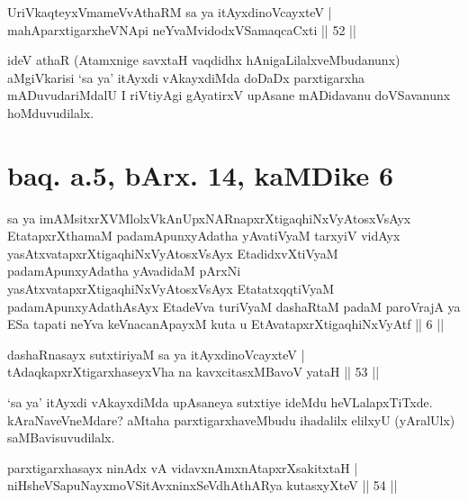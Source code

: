 
\begin{shl}
UriVkaqteyxVmameVvAthaRM sa ya itAyxdinoVcayxteV | \\
mahAparxtigarxheVNApi neYvaMvidodxVSamaqcaCxti \hfill ||  52 || 
\end{shl}

\begin{artha} 
ideV athaR (Atamxnige savxtaH vaqdidhx hAnigaLilalxveMbudanunx) 
aMgiVkarisi `sa ya' itAyxdi vAkayxdiMda doDaDx parxtigarxha 
mADuvudariMdalU I riVtiyAgi gAyatirxV upAsane mADidavanu doVSavanunx 
hoMduvudilalx. 
\end{artha}

\section*{baq. a.5, bArx. 14, kaMDike 6}

\begin{shl}
sa ya imAMsitxrXVMlolxVkAnUpxNARnapxrXtigaqhiNxVyAtosxV\s sAyx EtatapxrXthamaM padamApunxyAdatha yAvatiVyaM tarxyiV vidAyx yasAtxvatapxrXtigaqhiNxVyAtosxV\s sAyx EtadidxvXtiVyaM padamApunxyAdatha yAvadidaM pArxNi yasAtxvatapxrXtigaqhiNxVyAtosxV\s sAyx EtatatxqqtiVyaM padamApunxyAdathAsAyx EtadeVva turiVyaM dashaRtaM padaM paroVrajA ya ESa tapati neYva keVnacanApayxM kuta u EtAvatapxrXtigaqhiNxVyAtf || 6 ||
\end{shl}

\begin{shl}
dashaRnasayx sutxtiriyaM sa ya itAyxdinoVcayxteV | \\
tAdaqkapxrXtigarxhaseyxVha na kavxcitasxMBavoV yataH \hfill ||  53 || 
\end{shl}

\begin{artha} 
`sa ya' itAyxdi vAkayxdiMda upAsaneya sutxtiye ideMdu heVLalapxTiTxde. 
kAraNaveVneMdare? aMtaha parxtigarxhaveMbudu ihadalilx elilxyU 
(yAralUlx) saMBavisuvudilalx.
\end{artha}


\begin{shl}
parxtigarxhasayx ninAdx vA vidavxnAmxnAtapxrXsakitxtaH | \\
niHsheVSapuNayxmoVSitAvxninxSeVdhAthARya kutasxyXteV \hfill ||  54 || 
\end{shl}

